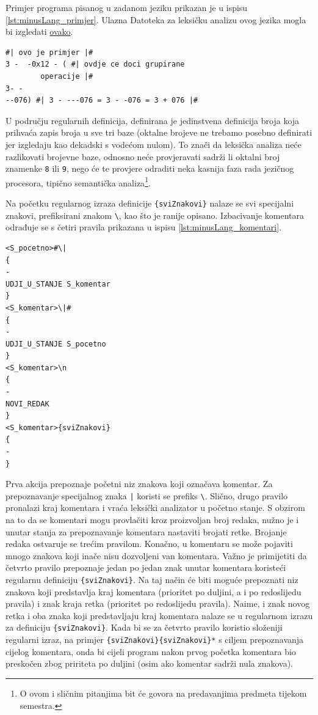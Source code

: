 \documentclass[times, 12pt, utf8]{book}
\begin{document}
Primjer programa pisanog u zadanom jeziku prikazan je u ispisu \ref{lst:minusLang_primjer}.
Ulazna Datoteka za leksičku analizu ovog jezika mogla bi izgledati \href{https://github.com/fer-ppj/ppj-labosi/raw/master/res/lab1/minusLang.lan}{ovako}.

\begin{lstlisting}[caption={Primjer programa pisanog u jeziku \emph{minusLang}.},label=lst:minusLang_primjer]
#| ovo je primjer |#
3 -  -0x12 - ( #| ovdje ce doci grupirane
		operacije |#
3- -
--076) #| 3 - ---076 = 3 - -076 = 3 + 076 |#

\end{lstlisting}

U području regularnih definicija, definirana je jedinstvena definicija broja koja prihvaća zapis broja u sve tri baze (oktalne brojeve ne trebamo posebno definirati jer izgledaju kao dekadski s vodećom nulom).
To znači da leksička analiza neće razlikovati brojevne baze, odnosno neće provjeravati sadrži li oktalni broj znamenke \verb|8| ili \verb|9|, nego će te provjere odraditi neka kasnija faza rada jezičnog procesora, tipično semantička analiza\footnote{O ovom i sličnim pitanjima bit će govora na predavanjima predmeta tijekom semestra.}.

Na početku regularnog izraza definicije \verb|{sviZnakovi}| nalaze se svi specijalni znakovi, prefiksirani znakom \verb|\|, kao što je ranije opisano.
Izbacivanje komentara odrađuje se s četiri pravila prikazana u ispisu \ref{lst:minusLang_komentari}.

\begin{lstlisting}[caption={Pravila za izbacivanje komentara iz ulaznog programa.},label=lst:minusLang_komentari]
<S_pocetno>#\|
{
-
UDJI_U_STANJE S_komentar
}
<S_komentar>\|#
{
-
UDJI_U_STANJE S_pocetno
}
<S_komentar>\n
{
-
NOVI_REDAK
}
<S_komentar>{sviZnakovi}
{
-
}
\end{lstlisting}

Prva akcija prepoznaje početni niz znakova koji označava komentar.
Za prepoznavanje specijalnog znaka \verb=|= koristi se prefiks \verb|\|.
Slično, drugo pravilo pronalazi kraj komentara i vraća leksički analizator u početno stanje.
S obzirom na to da se komentari mogu provlačiti kroz proizvoljan broj redaka, nužno je i unutar stanja za prepoznavanje komentara nastaviti brojati retke.
Brojanje redaka ostvaruje se trećim pravilom.
Konačno, u komentaru se može pojaviti mnogo znakova koji inače nisu dozvoljeni van komentara.
Važno je primijetiti da četvrto pravilo prepoznaje jedan po jedan znak unutar komentara koristeći regularnu definiciju \verb|{sviZnakovi}|.
Na taj način će biti moguće prepoznati niz znakova koji predstavlja kraj komentara (prioritet po duljini, a i po redoslijedu pravila) i znak kraja retka (prioritet po redoslijedu pravila).
Naime, i znak novog retka i oba znaka koji predstavljaju kraj komentara nalaze se u regularnom izrazu za definiciju \verb|{sviZnakovi}|.
Kada bi se za četvrto pravilo koristio složeniji regularni izraz, na primjer \verb|{sviZnakovi}{sviZnakovi}*| s ciljem prepoznavanja cijelog komentara, onda bi cijeli program nakon prvog početka komentara bio preskočen zbog pririteta po duljini (osim ako komentar sadrži nula znakova).
\end{document}
